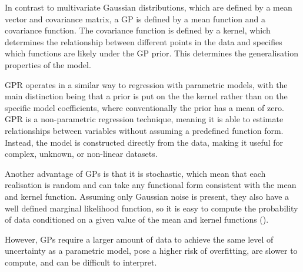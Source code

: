 In contrast to multivariate Gaussian distributions, which are defined by a mean vector and covariance matrix, a GP is defined by a mean function and a covariance function. The covariance function is defined by a kernel, which determines the relationship between different points in the data and specifies which functions are likely under the GP prior. This determines the generalisation properties of the model.


GPR operates in a similar way to regression with parametric models, with the main distinction being that a prior is put on the the kernel rather than on the specific model coefficients, where conventionally the prior has a mean of zero. GPR is a non-parametric regression technique, meaning it is able to estimate relationships between variables without assuming a predefined function form. Instead, the model is constructed directly from the data, making it useful for complex, unknown, or non-linear datasets. 

Another advantage of GPs is that it is stochastic, which mean that each realisation is random and can take any functional form consistent with the mean and kernel function. Assuming only Gaussian noise is present, they also have a well defined marginal likelihood function, so it is easy to compute the probability of data conditioned on a given value of the mean and kernel functions (\cite{lugerMappingStellarSurfaces2021}). %

However, GPs require a larger amount of data to achieve the same level of uncertainty as a parametric model, pose a higher risk of overfitting, are slower to compute, and can be difficult to interpret.

